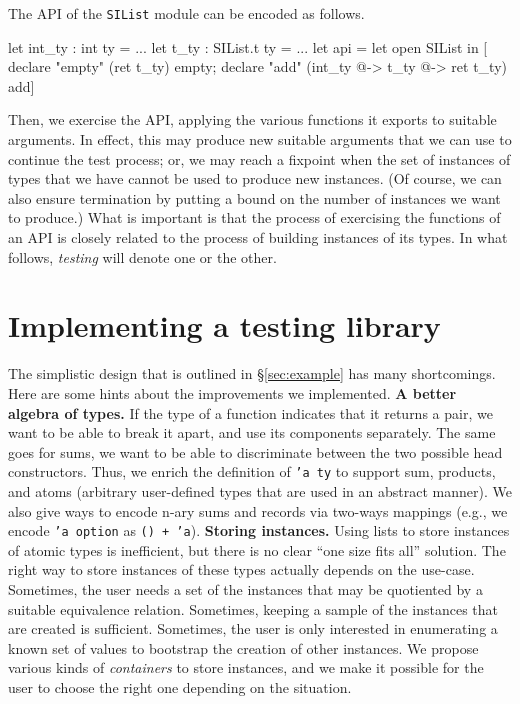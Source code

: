 \documentclass[twocolumn,9pt]{article}
\newcommand{\code}[1]{\texttt{#1}}
\newcommand{\sref}[1]{\S\ref{#1}}
\renewcommand\paragraph[1]{\newline\textbf{#1}}
\begin{document}
The API of the \code{SIList} module can be encoded as follows.
\begin{ocamlcode}
let int_ty : int ty = ...
let t_ty : SIList.t ty = ...
let api =
  let open SIList in
  [ declare "empty" (ret t_ty) empty;
    declare "add" (int_ty @-> t_ty @-> ret t_ty) add]
\end{ocamlcode}
Then, we exercise the API, applying the various functions it exports
to suitable arguments. In effect, this may produce new suitable
arguments that we can use to continue the test process; or, we may
reach a fixpoint when the set of instances of types that we have
cannot be used to produce new instances. (Of course, we can also
ensure termination by putting a bound on the number of instances we
want to produce.)  What is important is that the process of exercising
the functions of an API is closely related to the process of building
instances of its types. In what follows, \emph{testing} will denote
one or the other.

\section{Implementing a testing library}
The simplistic design that is outlined in \sref{sec:example} has many
shortcomings. Here are some hints about the improvements we
implemented.
%
\paragraph{A better algebra of types.} If the type of a function
indicates that it returns a pair, we want to be able to break it
apart, and use its components separately. The same goes for sums, we
want to be able to discriminate between the two possible head
constructors. Thus, we enrich the definition of \code{'a ty} to
support sum, products, and atoms (arbitrary user-defined types that
are used in an abstract manner). We also give ways to encode n-ary
sums and records via two-ways mappings (e.g., we encode \code{'a
  option} as \code{() + 'a}).
%
\paragraph{Storing instances.} Using lists to store instances of
atomic types is inefficient, but there is no clear ``one size fits
all'' solution. The right way to store instances of these types
actually depends on the use-case.
%
Sometimes, the user needs a set of the instances that may be
quotiented by a suitable equivalence relation.
%
Sometimes, keeping a sample of the instances that are created is
sufficient.
%
Sometimes, the user is only interested in enumerating a known set of
values to bootstrap the creation of other instances.
%
We propose various kinds of \emph{containers} to store instances, and
we make it possible for the user to choose the right one depending on
the situation.
%
\end{document}
